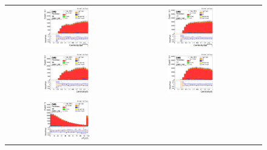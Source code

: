 \begin{figure}[ht]
  \begin{center}
    \begin{tabular}{ccc}
      \includegraphics[width=0.4\textwidth]{figures/tW/fig/FCNC_MVA_input/ee/H_BSM_xj1b_Cl1_j1.png}&
      \includegraphics[width=0.4\textwidth]{figures/tW/fig/FCNC_MVA_input/mumu/H_BSM_xj1b_Cl1_j1.png}\\
      \includegraphics[width=0.4\textwidth]{figures/tW/fig/FCNC_MVA_input/ee/H_BSM_xj1b_Cll.png}&
      \includegraphics[width=0.4\textwidth]{figures/tW/fig/FCNC_MVA_input/mumu/H_BSM_xj1b_Cll.png}\\
      \includegraphics[width=0.4\textwidth]{figures/tW/fig/FCNC_MVA_input/ee/H_BSM_xj1b_dPt_l1_l2.png}&

\end{tabular}
\end{center}
\end{figure}
